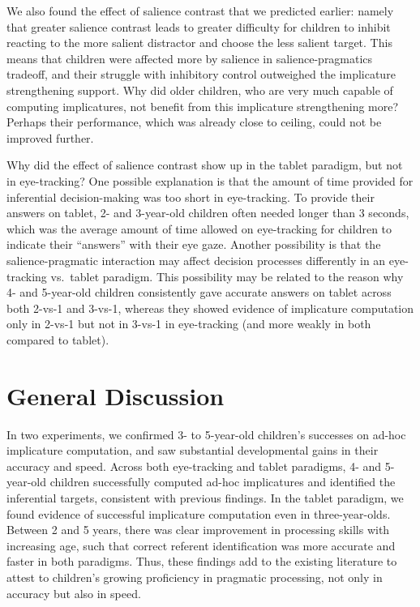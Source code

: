\documentclass[a4paper,man,apacite,floatsintext]{apa6}
\begin{document}
We also found the effect of salience contrast that we predicted earlier:
namely that greater salience contrast leads to greater difficulty for
children to inhibit reacting to the more salient distractor and choose
the less salient target. This means that children were affected more by
salience in salience-pragmatics tradeoff, and their struggle with
inhibitory control outweighed the implicature strengthening support. Why
did older children, who are very much capable of computing implicatures,
not benefit from this implicature strengthening more? Perhaps their
performance, which was already close to ceiling, could not be improved
further.

Why did the effect of salience contrast show up in the tablet paradigm,
but not in eye-tracking? One possible explanation is that the amount of
time provided for inferential decision-making was too short in
eye-tracking. To provide their answers on tablet, 2- and 3-year-old
children often needed longer than 3 seconds, which was the average
amount of time allowed on eye-tracking for children to indicate their
``answers'' with their eye gaze. Another possibility is that the
salience-pragmatic interaction may affect decision processes differently
in an eye-tracking vs.~tablet paradigm. This possibility may be related
to the reason why 4- and 5-year-old children consistently gave accurate
answers on tablet across both 2-vs-1 and 3-vs-1, whereas they showed
evidence of implicature computation only in 2-vs-1 but not in 3-vs-1 in
eye-tracking (and more weakly in both compared to tablet).

\section{General Discussion}\label{general-discussion}

In two experiments, we confirmed 3- to 5-year-old children's successes
on ad-hoc implicature computation, and saw substantial developmental
gains in their accuracy and speed. Across both eye-tracking and tablet
paradigms, 4- and 5-year-old children successfully computed ad-hoc
implicatures and identified the inferential targets, consistent with
previous findings. In the tablet paradigm, we found evidence of
successful implicature computation even in three-year-olds. Between 2
and 5 years, there was clear improvement in processing skills with
increasing age, such that correct referent identification was more
accurate and faster in both paradigms. Thus, these findings add to the
existing literature to attest to children's growing proficiency in
pragmatic processing, not only in accuracy but also in speed.
\end{document}
